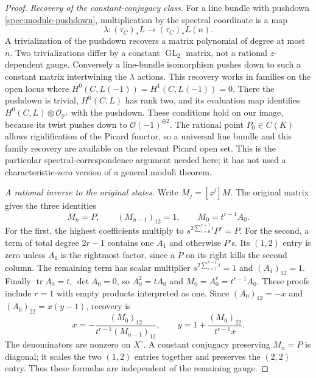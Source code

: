 \begin{proof}
\emph{Recovery of the constant-conjugacy class.}
For a line bundle with pushdown \eqref{spec:module-pushdown},
multiplication by the spectral coordinate is a map
\[
\lambda:(\tau_C)_*L\longrightarrow(\tau_C)_*L(n).
\]
A trivialization of the pushdown recovers a matrix polynomial of
degree at most $n$.  Two trivializations differ by a constant
$\operatorname{GL}_2$ matrix, not a rational $z$-dependent gauge.
Conversely a line-bundle isomorphism pushes down to such a constant
matrix intertwining the $\lambda$ actions.  This recovery works
in families on the open locus where
$H^0(C,L(-1))=H^1(C,L(-1))=0$.  There the pushdown is trivial,
$H^0(C,L)$ has rank two, and its evaluation map identifies
$H^0(C,L)\otimes\mathcal O_{\mathbb P^1}$ with the pushdown.
These conditions hold on our image, because its twist pushes down
to $\mathcal O(-1)^{\oplus2}$.  The rational point $P_0\in C(K)$
allows rigidification of the Picard functor, so a universal line
bundle and this family recovery are available on the relevant
Picard open set.  This is the particular spectral-correspondence
argument needed here; it has not used a characteristic-zero
version of a general moduli theorem.

\emph{A rational inverse to the original states.}
Write $M_j=[z^j]M$.  The original matrix gives the three identities
\begin{equation}
M_n=P,\qquad (M_{n-1})_{12}=1,\qquad
M_0=t^{r-1}A_0.
\label{spec:endpoint-coefficients}
\end{equation}
For the first, the highest coefficients multiply to
$s^{2\sum_{i=0}^{r-1}i}P^r=P$.
For the second, a term of total degree $2r-1$ contains one $A_1$
and otherwise $P$'s.  Its $(1,2)$ entry is zero unless $A_1$ is
the rightmost factor, since a $P$ on its right kills the second
column.  The remaining term has scalar multiplier
$s^{2\sum_{i=1}^{r-1}i}=1$ and $(A_1)_{12}=1$.
Finally $\operatorname{tr}A_0=t$, $\det A_0=0$, so
$A_0^2=tA_0$ and $M_0=A_0^r=t^{r-1}A_0$.
These proofs include $r=1$ with empty products interpreted as one.
Since $(A_0)_{12}=-x$ and $(A_0)_{22}=x(y-1)$, recovery is
\begin{equation}
x=-\frac{(M_0)_{12}}{t^{r-1}(M_{n-1})_{12}},\qquad
y=1+\frac{(M_0)_{22}}{t^{r-1}x}.
\label{spec:state-inverse}
\end{equation}
The denominators are nonzero on $X^\circ$.  A constant conjugacy
preserving $M_n=P$ is diagonal; it scales the two $(1,2)$ entries
together and preserves the $(2,2)$ entry.  Thus these formulas are
independent of the remaining gauge.


\end{proof}
